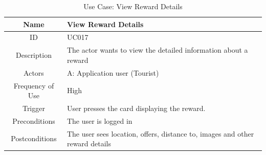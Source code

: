 \documentclass[12pt, a4paper, oneside]{article}
\begin{document}
\begin{table}[H]
\begin{tabularx}{\linewidth}{|c|X|}
\hline
Name                & View Reward Details                                                                                                                                                                                                                     \\ \hline
ID                  & UC017                                                                                                                                                                                                                       \\ \hline
Description         & The actor wants to view the detailed information about a reward                                                                                                                                                   \\ \hline
Actors              & A: Application user (Tourist)                                                                                                                                                                                                 \\ \hline
Frequency of Use    & High                                                                                                                                                                                                                    \\ \hline
Trigger             & User presses the card displaying the reward.                                                                                                                                                                                           \\ \hline
Preconditions       & The user is logged in                                                                                                                                                                                                                          \\ \hline
Postconditions      & The user sees location, offers, distance to, images and other reward details                                                                                                                                      \\ \hline
\end{tabularx}
\caption{Use Case: View Reward Details}
\label{uc-view-reward-details}
\end{table}
\end{document}
